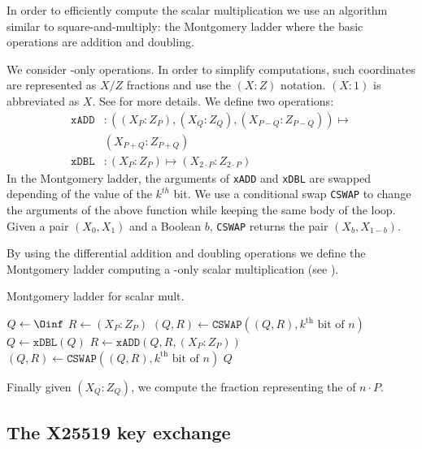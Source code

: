 In order to efficiently compute the scalar multiplication we use an algorithm
similar to square-and-multiply: the Montgomery ladder where the basic operations
are addition and doubling.

We consider \xcoord-only operations. In order to simplify computations,
such coordinates are represented as $X/Z$ fractions and use the $(X : Z)$ notation.
$(X : 1)$ is abbreviated as $X$. See  for more details.
We define two operations:
\begin{align*}
\texttt{xADD} &: ((X_P:Z_P), (X_Q:Z_Q), (X_{P - Q}:Z_{P - Q})) \mapsto \\
&(X_{P + Q}:Z_{P + Q})\\
\texttt{xDBL} &: (X_P:Z_P) \mapsto (X_{2 \cdot P}:Z_{2 \cdot P})
\end{align*}
In the Montgomery ladder, %
the arguments of \texttt{xADD} and \texttt{xDBL}
are swapped depending of the value of the $k^{th}$ bit. We use a conditional
swap \texttt{CSWAP} to change the arguments of the above function while keeping
the same body of the loop.
Given a pair $(X_0, X_1)$ and a Boolean $b$, \texttt{CSWAP} returns the pair
$(X_b, X_{1-b})$.

By using the differential addition and doubling operations we define the Montgomery ladder
computing a \xcoord-only scalar multiplication (see ).
\begin{algorithm}
\caption{Montgomery ladder for scalar mult.}
\label{alg:montgomery-ladder}
\begin{algorithmic}
\STATE $Q \leftarrow \Oinf$
\STATE $R \leftarrow (X_P:Z_P)$
  \STATE $(Q,R) \leftarrow \texttt{CSWAP}((Q,R), k^{\text{th}}\text{ bit of }n)$
  \STATE $Q \leftarrow \texttt{xDBL}(Q)$
  \STATE $R \leftarrow \texttt{xADD}(Q,R,(X_P:Z_P))$
  \STATE $(Q,R) \leftarrow \texttt{CSWAP}((Q,R), k^{\text{th}}\text{ bit of }n)$
\ENDFOR
\RETURN $Q$
\end{algorithmic}
\end{algorithm}

Finally given $(X_Q : Z_Q)$, we compute the fraction representing the \xcoord of $n \cdot P$.



\subsection{The X25519 key exchange}
\label{subsec:X25519-key-exchange}

